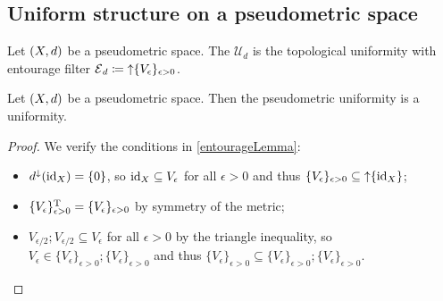 \subsection{Uniform structure on a pseudometric space}
\begin{definition}
Let $\sSet{X,d}$ be a pseudometric space. The  $\mathcal{U}_d$ is the topological uniformity with entourage filter $\operatorname{\mathcal{E}}_d \coloneqq \operatorname{\uparrow} \{V_\epsilon\}_{\epsilon > 0}$.
\end{definition}

\begin{proposition}
Let $\sSet{X,d}$ be a pseudometric space. Then the pseudometric uniformity is a uniformity.
\end{proposition}
\begin{proof}
We verify the conditions in \ref{entourageLemma}:
\begin{itemize}
\item $d^{\downarrow}(\operatorname{id}_X) = \{0\}$, so $\operatorname{id}_X \subseteq V_\epsilon$ for all $\epsilon > 0$ and thus $\{V_\epsilon\}_{\epsilon>0}\subseteq\operatorname{\uparrow}\{\operatorname{id}_X\}$;
\item $\{V_\epsilon\}_{\epsilon>0}^{\mathrm{T}} = \{V_\epsilon\}_{\epsilon>0}$ by symmetry of the metric;
\item $V_{\epsilon/2};V_{\epsilon/2} \subseteq V_\epsilon$ for all $\epsilon>0$ by the triangle inequality, so $V_\epsilon \in \{V_\epsilon\}_{\epsilon>0}; \{V_\epsilon\}_{\epsilon>0}$ and thus $\{V_\epsilon\}_{\epsilon>0} \subseteq \{V_\epsilon\}_{\epsilon>0}; \{V_\epsilon\}_{\epsilon>0}$.
\end{itemize}
\end{proof}


